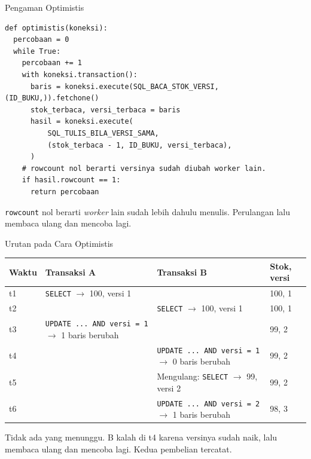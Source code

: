 \documentclass[aspectratio=169, table, 12pt]{beamer}
\begin{document}
\begin{frame}[fragile]{{\Large Pengaman Optimistis}}
  \vspace{2pt}
\begin{lstlisting}[style=PythonStyle]
def optimistis(koneksi):
  percobaan = 0
  while True:
    percobaan += 1
    with koneksi.transaction():
      baris = koneksi.execute(SQL_BACA_STOK_VERSI, (ID_BUKU,)).fetchone()
      stok_terbaca, versi_terbaca = baris
      hasil = koneksi.execute(
          SQL_TULIS_BILA_VERSI_SAMA,
          (stok_terbaca - 1, ID_BUKU, versi_terbaca),
      )
    # rowcount nol berarti versinya sudah diubah worker lain.
    if hasil.rowcount == 1:
      return percobaan
\end{lstlisting}

  \vspace{2pt}
  {\footnotesize \texttt{rowcount} nol berarti \textit{worker} lain sudah
  lebih dahulu menulis. Perulangan lalu membaca ulang dan mencoba lagi.}
\end{frame}

\begin{frame}{{\Large Urutan pada Cara Optimistis}}
  \vspace{5pt}
  {\centering
  {\footnotesize
  \begin{tabularx}{\textwidth}{lYYl}
    \hline
    \textbf{Waktu} & \textbf{Transaksi A} & \textbf{Transaksi B} & \textbf{Stok, versi} \\
    \hline
    t1 & \texttt{SELECT} $\rightarrow$ 100, versi 1 & & 100, 1 \\
    \hline
    t2 & & \texttt{SELECT} $\rightarrow$ 100, versi 1 & 100, 1 \\
    \hline
    t3 & \texttt{UPDATE ... AND versi = 1} $\rightarrow$ 1 baris berubah & & 99, 2 \\
    \hline
    t4 & & \texttt{UPDATE ... AND versi = 1} $\rightarrow$ 0 baris berubah & 99, 2 \\
    \hline
    t5 & & Mengulang: \texttt{SELECT} $\rightarrow$ 99, versi 2 & 99, 2 \\
    \hline
    t6 & & \texttt{UPDATE ... AND versi = 2} $\rightarrow$ 1 baris berubah & 98, 3 \\
    \hline
  \end{tabularx}}\par}

  \vspace{8pt}
  {\footnotesize Tidak ada yang menunggu. B kalah di t4 karena versinya sudah
  naik, lalu membaca ulang dan mencoba lagi. Kedua pembelian tercatat.}
\end{frame}
\end{document}
